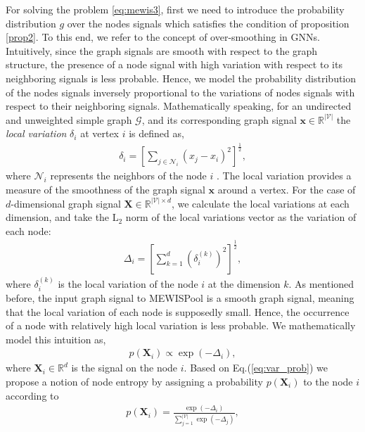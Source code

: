 \documentclass{article}
\begin{document}
For solving the problem \ref{eq:mewis3}, first we need to introduce the probability distribution $g$ over the nodes signals which satisfies the condition of proposition \ref{prop2}. To this end, we refer to the concept of over-smoothing in GNNs. Intuitively, since the graph signals are smooth with respect to the graph structure, the presence of a node signal with high variation with respect to its neighboring signals is less probable. Hence, we model the probability distribution of the nodes signals inversely proportional to the variations of nodes signals with respect to their neighboring signals. Mathematically speaking, for an undirected and unweighted simple graph $\mathcal{G}$, and its corresponding graph signal $\mathbf{x} \in \mathbb{R}^{|\mathcal{V}|}$ the \textit{local variation} $\delta_i$ at vertex $i$ is defined as,
\begin{gather}
	\delta_i = \left[\sum_{j \in \mathcal{N}_i}(x_j - x_i)^2\right]^\frac{1}{2},
\end{gather}
where $\mathcal{N}_i$ represents the neighbors of the node $i$ \cite{emergingfields}. The local variation provides a measure of the smoothness of the graph signal $\mathbf{x}$ around a vertex. For the case of $d$-dimensional graph signal $\mathbf{X} \in \mathbb{R}^{|\mathcal{V}|\times d}$, we calculate the local variations at each dimension, and take the $\textrm{L}_2$ norm of the local variations vector as the variation of each node:
\begin{gather}\label{eq:Delta}
	\Delta_i = \left[\sum_{k=1}^d(\delta_i^{(k)})^2\right]^\frac{1}{2},
\end{gather}
where $\delta_i^{(k)}$ is the local variation of the node $i$ at the dimension $k$. As mentioned before, the input graph signal to MEWISPool is a smooth graph signal, meaning that the local variation of each node is supposedly small. Hence, the occurrence of a node with relatively high local variation is less probable. We mathematically model this intuition as,
\begin{gather}
	\label{eq:var_prob}
	p(\mathbf{X}_i) \propto \exp(-\Delta_i),
\end{gather}
where $\mathbf{X}_i \in \mathbb{R}^d$ is the signal on the node $i$. Based on Eq.(\ref{eq:var_prob}) we propose a notion of node entropy by assigning a probability $p(\mathbf{X}_i)$ to the node $i$ according to
\begin{gather}\label{eq:softmax}
	p(\mathbf{X}_i) = \frac{\exp(-\Delta_i)}{\sum_{j=1}^{|\mathcal{V}|} \exp(-\Delta_j)},
\end{gather}
\end{document}
